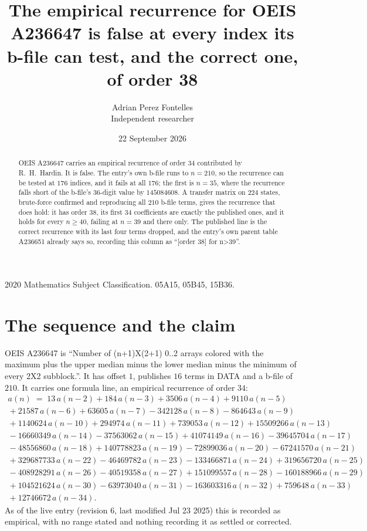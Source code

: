 \documentclass[11pt,a4paper]{article}
\title{The empirical recurrence for OEIS A236647 is false at every index its b-file can
test, and the correct one, of order 38}
\author{Adrian Perez Fontelles\\ \small Independent researcher}
\date{22 September 2026}
\theoremstyle{plain}
\theoremstyle{definition}
\begin{document}
\maketitle

\begin{abstract}
OEIS A236647 carries an empirical recurrence of order $34$ contributed by R.~H.~Hardin. It
is false. The entry's own b-file runs to $n=210$, so the recurrence can be tested at $176$
indices, and it fails at all $176$; the first is $n=35$, where the recurrence falls short of
the b-file's $36$-digit value by $145084608$. A
transfer matrix on $224$ states, brute-force confirmed and reproducing all $210$ b-file
terms, gives the recurrence that does hold: it has order $38$, its first $34$
coefficients are exactly the published ones, and it holds for every $n\ge40$, failing at
$n=39$ and there only. The published line is the correct recurrence with its last four
terms dropped, and the entry's own parent table A236651 already says so, recording this
column as ``[order 38] for n>39''.
\end{abstract}

\noindent\small 2020 Mathematics Subject Classification. 05A15, 05B45, 15B36.\normalsize

\section{The sequence and the claim}

OEIS A236647 is ``Number of (n+1)X(2+1) 0..2 arrays colored with the maximum plus the upper
median minus the lower median minus the minimum of every 2X2 subblock.''. It has offset $1$,
publishes $16$ terms in DATA and a b-file of $210$. It carries one formula line, an
empirical recurrence of order $34$:
\begin{multline}\label{eq:conj}
a(n)\;=\;13\,a(n-2) + 184\,a(n-3) + 3506\,a(n-4) + 9110\,a(n-5)\\
{}+ 21587\,a(n-6) + 63605\,a(n-7) - 342128\,a(n-8) - 864643\,a(n-9)\\
{}+ 1140624\,a(n-10) + 294974\,a(n-11) + 739053\,a(n-12) + 15509266\,a(n-13)\\
{}- 16660349\,a(n-14) - 37563062\,a(n-15) + 41074149\,a(n-16) - 39645704\,a(n-17)\\
{}- 48556860\,a(n-18) + 140778823\,a(n-19) - 72899036\,a(n-20) - 67241570\,a(n-21)\\
{}+ 329687733\,a(n-22) - 46469782\,a(n-23) - 133466871\,a(n-24) + 319656720\,a(n-25)\\
{}- 408928291\,a(n-26) - 40519358\,a(n-27) + 151099557\,a(n-28) - 160188966\,a(n-29)\\
{}+ 104521624\,a(n-30) - 63973040\,a(n-31) - 163603316\,a(n-32) + 759648\,a(n-33)\\
{}+ 12746672\,a(n-34).
\end{multline}
As of the live entry (revision $6$, last modified Jul 23 2025) this is recorded as empirical,
with no range stated and nothing recording it as settled or corrected.
\end{document}
